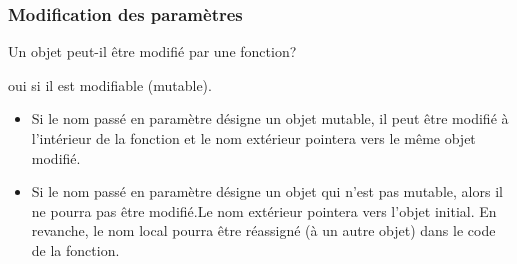 \begin{frame}
  \frametitle{Modification des paramètres}
Un objet peut-il être modifié par une fonction?

oui si il est modifiable (mutable).\newline
\begin{itemize}
  \item Si le nom passé en paramètre désigne un objet mutable, il peut être modifié à l'intérieur de la fonction et le nom extérieur pointera vers le même objet modifié.
  \item Si le nom passé en paramètre désigne un objet qui n'est pas mutable, alors il ne pourra pas être modifié.Le nom extérieur pointera vers l'objet initial. En revanche, le nom local pourra être réassigné (à un autre objet) dans le code de la fonction. 

\end{itemize}
\end{frame}


